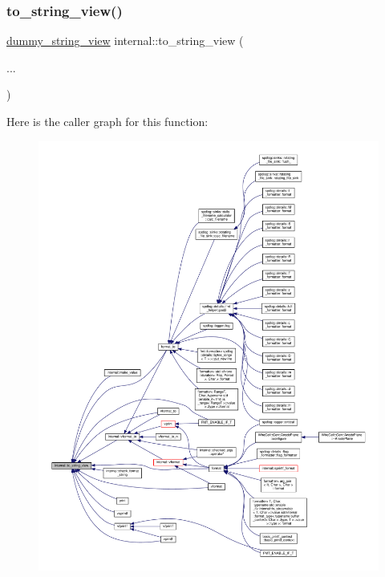 \subsubsection{\texorpdfstring{to\+\_\+string\+\_\+view()}{to\_string\_view()}}
{\footnotesize\ttfamily \hyperlink{structinternal_1_1dummy__string__view}{dummy\+\_\+string\+\_\+view} internal\+::to\+\_\+string\+\_\+view (\begin{DoxyParamCaption}\item[{}]{... }\end{DoxyParamCaption})}

Here is the caller graph for this function\+:
\nopagebreak
\begin{figure}[H]
\begin{center}
\leavevmode
\includegraphics[width=350pt]{namespaceinternal_a153fda3826e43649ab74f70396f9d5bc_icgraph}
\end{center}
\end{figure}
\mbox{\label{namespaceinternal_acc608c40c33952a5382db8aaaddfc854}} 
